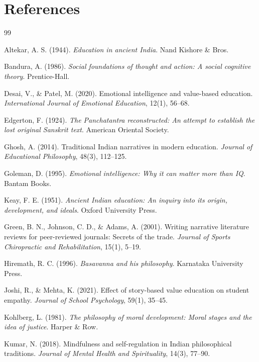 \documentclass[12pt,a4paper,twocolumn]{article}
\begin{document}
\newpage

\onecolumn
\section*{References}
\begin{thebibliography}{99}
\setlength{\itemsep}{0.1cm}

Altekar, A. S. (1944). \textit{Education in ancient India}. Nand Kishore \& Bros.

Bandura, A. (1986). \textit{Social foundations of thought and action: A social cognitive theory}. Prentice-Hall.

Desai, V., \& Patel, M. (2020). Emotional intelligence and value-based education. \textit{International Journal of Emotional Education}, 12(1), 56--68.

Edgerton, F. (1924). \textit{The Panchatantra reconstructed: An attempt to establish the lost original Sanskrit text}. American Oriental Society.

Ghosh, A. (2014). Traditional Indian narratives in modern education. \textit{Journal of Educational Philosophy}, 48(3), 112--125.

Goleman, D. (1995). \textit{Emotional intelligence: Why it can matter more than IQ}. Bantam Books.

Keay, F. E. (1951). \textit{Ancient Indian education: An inquiry into its origin, development, and ideals}. Oxford University Press.

Green, B. N., Johnson, C. D., \& Adams, A. (2001). Writing narrative literature reviews for peer-reviewed journals: Secrets of the trade. \textit{Journal of Sports Chiropractic and Rehabilitation}, 15(1), 5--19.

Hiremath, R. C. (1996). \textit{Basavanna and his philosophy}. Karnataka University Press.

Joshi, R., \& Mehta, K. (2021). Effect of story-based value education on student empathy. \textit{Journal of School Psychology}, 59(1), 35--45.

Kohlberg, L. (1981). \textit{The philosophy of moral development: Moral stages and the idea of justice}. Harper \& Row.

Kumar, N. (2018). Mindfulness and self-regulation in Indian philosophical traditions. \textit{Journal of Mental Health and Spirituality}, 14(3), 77--90.


\end{thebibliography}
\end{document}
